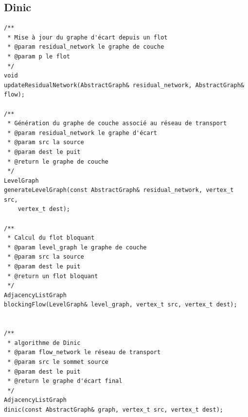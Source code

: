 \subsection{Dinic}

\begin{verbatim}
/**
 * Mise à jour du graphe d'écart depuis un flot
 * @param residual_network le graphe de couche
 * @param p le flot
 */
void
updateResidualNetwork(AbstractGraph& residual_network, AbstractGraph& flow);

/**
 * Génération du graphe de couche associé au réseau de transport
 * @param residual_network le graphe d'écart
 * @param src la source
 * @param dest le puit
 * @return le graphe de couche
 */
LevelGraph
generateLevelGraph(const AbstractGraph& residual_network, vertex_t src,
    vertex_t dest);

/**
 * Calcul du flot bloquant
 * @param level_graph le graphe de couche
 * @param src la source
 * @param dest le puit
 * @return un flot bloquant
 */
AdjacencyListGraph
blockingFlow(LevelGraph& level_graph, vertex_t src, vertex_t dest);


/**
 * algorithme de Dinic
 * @param flow_network le réseau de transport
 * @param src le sommet source
 * @param dest le puit
 * @return le graphe d'écart final
 */
AdjacencyListGraph
dinic(const AbstractGraph& graph, vertex_t src, vertex_t dest);

\end{verbatim}
